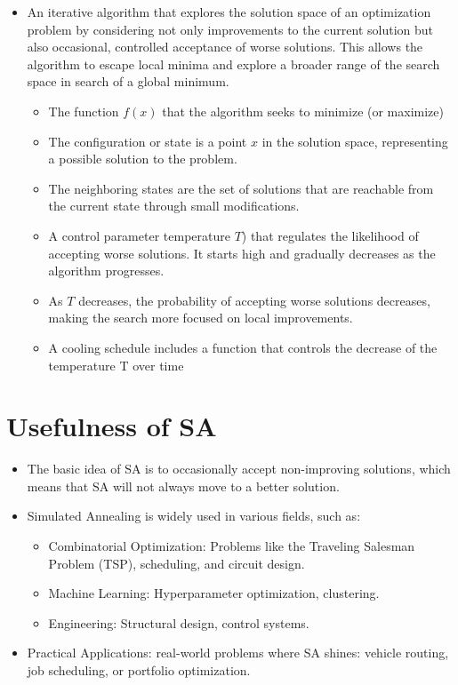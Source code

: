 \documentclass[
  letterpaper,
  DIV=11,
  numbers=noendperiod]{scrreprt}
\providecommand{\tightlist}{%
  \setlength{\itemsep}{0pt}\setlength{\parskip}{0pt}}\usepackage{longtable,booktabs,array}
\begin{document}
\begin{itemize}
\tightlist
\item
  An iterative algorithm that explores the solution space of an
  optimization problem by considering not only improvements to the
  current solution but also occasional, controlled acceptance of worse
  solutions. This allows the algorithm to escape local minima and
  explore a broader range of the search space in search of a global
  minimum.

  \begin{itemize}
  \tightlist
  \item
    The function \(f(x)\) that the algorithm seeks to minimize (or
    maximize)
  \item
    The configuration or state is a point \(x\) in the solution space,
    representing a possible solution to the problem.
  \item
    The neighboring states are the set of solutions that are reachable
    from the current state through small modifications.
  \item
    A control parameter temperature \(T\)) that regulates the likelihood
    of accepting worse solutions. It starts high and gradually decreases
    as the algorithm progresses.
  \item
    As \(T\) decreases, the probability of accepting worse solutions
    decreases, making the search more focused on local improvements.
  \item
    A cooling schedule includes a function that controls the decrease of
    the temperature T over time
  \end{itemize}
\end{itemize}

\section{Usefulness of SA}\label{usefulness-of-sa}

\begin{itemize}
\tightlist
\item
  The basic idea of SA is to occasionally accept non-improving
  solutions, which means that SA will not always move to a better
  solution.
\item
  Simulated Annealing is widely used in various fields, such as:

  \begin{itemize}
  \tightlist
  \item
    Combinatorial Optimization: Problems like the Traveling Salesman
    Problem (TSP), scheduling, and circuit design.
  \item
    Machine Learning: Hyperparameter optimization, clustering.
  \item
    Engineering: Structural design, control systems.
  \end{itemize}
\item
  Practical Applications: real-world problems where SA shines: vehicle
  routing, job scheduling, or portfolio optimization.
\end{itemize}
\end{document}
